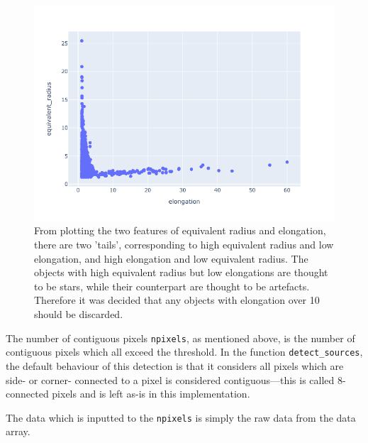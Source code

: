 \documentclass[a4paper,fleqn,usenatbib]{mnras}
\begin{document}
\begin{figure}
\includegraphics[width=\columnwidth]{../Figures/twotailed}
\caption{From plotting the two features of equivalent radius and elongation, there are two 'tails', corresponding to high equivalent radius and low elongation, and high elongation and low equivalent radius. The objects with high equivalent radius but low elongations are thought to be stars, while their counterpart are thought to be artefacts. Therefore it was decided that any objects with elongation over 10 should be discarded. \label{figure:twotailed}}	
\end{figure}

The number of contiguous pixels \texttt{npixels}, as mentioned above, is the number of contiguous pixels which all exceed the threshold. In the function \texttt{detect\_sources}, the default behaviour of this detection is that it considers all pixels which are side- or corner- connected to a pixel is considered contiguous---this is called 8-connected pixels and is left as-is in this implementation. 

The data which is inputted to the \texttt{npixels} is simply the raw data from the data array.
\end{document}
